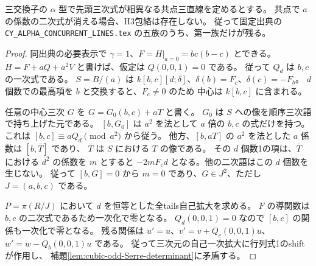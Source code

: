 \begin{proposition}\label{prop:cubic-CY-three-alpha-concurrent-reduction}
三交換子の $\alpha$ 型で先頭三次式が相異なる共点三直線を定めるとする。
共点で $a$ の係数の二次式が消える場合、H3包絡は存在しない。
従って固定出典\cite{AS4CYpinned}の
\texttt{CY\_ALPHA\_CONCURRENT\_LINES.tex} の五族のうち、第一族だけが残る。
\end{proposition}
\begin{proof}
同出典の必要表示で $\gamma=1$、$F=H|_{a=0}=bc(b-c)$ とできる。
$H=F+aQ+a^2V$ と書けば、仮定は $Q(0,0,1)=0$ である。
従って $Q_d$ は $b,c$ の一次式である。
$S=B/(a)$ は $k[b,c][d;\delta]$、$\delta(b)=F_c$、$\delta(c)=-F_b$。
$d$ 個数での最高項を $b$ と交換すると、$F_c\ne0$ のため
中心は $k[b,c]$ に含まれる。

任意の中心三次 $G$ を $G=G_0(b,c)+aT$ と書く。
$G_0$ は $S$ への像を順序三次語で持ち上げた元である。
$[b,G_0]$ は $a^2$ を法として $a$ 倍の $b,c$ の式だけを持つ。
これは $[b,c]\equiv aQ_d\pmod {a^2}$ から従う。
他方、$[b,aT]$ の $a^2$ を法とした $a$ 係数は $[b,\bar T]$ であり、
$\bar T$ は $S$ における $T$ の像である。
その $d$ 個数1の項は、$\bar T$ における $d^2$ の係数を $m$ とすると
$-2mF_c d$ となる。他の二次語はこの $d$ 個数を生じない。
従って $[b,G]=0$ から $m=0$ であり、$G\in J^2$、ただし $J=(a,b,c)$ である。

$P=\pi(R/J)$ において $d$ を恒等とした全tails自己拡大を求める。
$F$ の導関数は $b,c$ の二次式であるため一次化で零となる。
$Q_d(0,0,1)=0$ なので $[b,c]$ の関係も一次化で零となる。
残る関係は $u'=u$、$v'=v+Q_c(0,0,1)u$、
$w'=w-Q_b(0,0,1)u$ である。
従って三次元の自己一次拡大に行列式1のshiftが作用し、
補題\ref{lem:cubic-odd-Serre-determinant}に矛盾する。
\end{proof}

